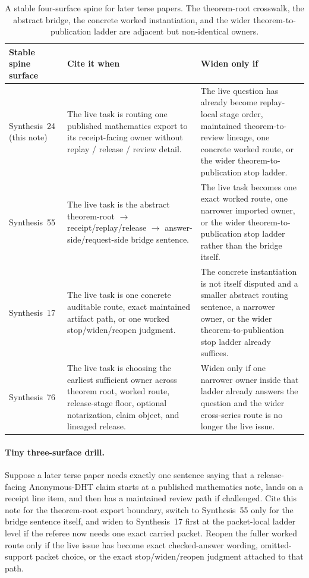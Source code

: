 \documentclass[11pt]{article}
\begin{document}
\begin{table}[t]
\centering
\small
\begin{tabularx}{\linewidth}{@{}L Y Y@{}}
\toprule
Stable spine surface & Cite it when & Widen only if \\
\midrule
Synthesis~24 (this note) & The live task is routing one published mathematics export to its receipt-facing owner without replay / release / review detail. & The live question has already become replay-local stage order, maintained theorem-to-review lineage, one concrete worked route, or the wider theorem-to-publication stop ladder. \\
Synthesis~55 & The live task is the abstract theorem-root $\to$ receipt/replay/release $\to$ answer-side/request-side bridge sentence. & The live task becomes one exact worked route, one narrower imported owner, or the wider theorem-to-publication stop ladder rather than the bridge itself. \\
Synthesis~17 & The live task is one concrete auditable route, exact maintained artifact path, or one worked stop/widen/reopen judgment. & The concrete instantiation is not itself disputed and a smaller abstract routing sentence, a narrower owner, or the wider theorem-to-publication stop ladder already suffices. \\
Synthesis~76 & The live task is choosing the earliest sufficient owner across theorem root, worked route, release-stage floor, optional notarization, claim object, and lineaged release. & Widen only if one narrower owner inside that ladder already answers the question and the wider cross-series route is no longer the live issue. \\
\bottomrule
\end{tabularx}
\caption{A stable four-surface spine for later terse papers. The theorem-root crosswalk, the abstract bridge, the concrete worked instantiation, and the wider theorem-to-publication ladder are adjacent but non-identical owners.}
\label{tab:mathcrosswalk-three-surface-spine}
\end{table}

\paragraph{Tiny three-surface drill.}
Suppose a later terse paper needs exactly one sentence saying that a release-facing Anonymous-DHT claim starts at a published mathematics note, lands on a receipt line item, and then has a maintained review path if challenged. Cite this note for the theorem-root export boundary, switch to Synthesis~55 only for the bridge sentence itself, and widen to Synthesis~17 first at the packet-local ladder level if the referee now needs one exact carried packet. Reopen the fuller worked route only if the live issue has become exact checked-answer wording, omitted-support packet choice, or the exact stop/widen/reopen judgment attached to that path.\cite{series:workedexample,series:seriesspines}
\end{document}
